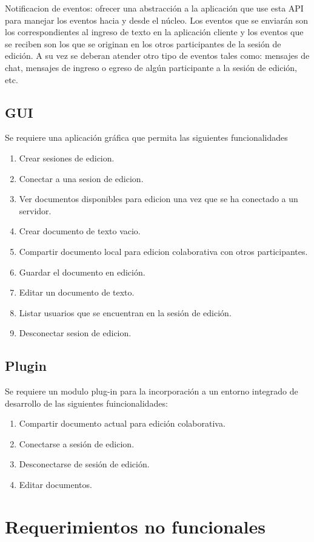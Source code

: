 \documentclass[12pt,a4paper]{article}
\begin{document}
Notificacion de eventos: ofrecer una abstracción a la aplicación que use esta API para manejar los eventos hacia y desde el núcleo. Los eventos que se enviarán son los correspondientes al ingreso de texto en la aplicación cliente y los eventos que se reciben son los que se originan en los otros participantes de la sesión de edición.
A su vez se deberan atender otro tipo de eventos tales como: mensajes de chat, mensajes de ingreso o egreso de algún participante a la sesión de edición, etc.

	\subsection{GUI} 
	Se requiere una aplicación gráfica que permita las siguientes funcionalidades
	\begin{enumerate}
	\item Crear sesiones de edicion.
	\item Conectar a una sesion de edicion.
	\item Ver documentos disponibles para edicion una vez que se ha conectado a un servidor.
	\item Crear documento de texto vacio.
	\item Compartir documento local para edicion colaborativa con otros participantes.
	\item Guardar el documento en edición.
	\item Editar un documento de texto.
	\item Listar usuarios que se encuentran en la sesión de edición.
	\item Desconectar sesion de edicion.
	\end{enumerate}


\subsection{Plugin}
Se requiere un modulo plug-in para la incorporación a un entorno integrado de desarrollo de las siguientes fuincionalidades:
	\begin{enumerate}
	\item Compartir documento actual para edición colaborativa.
	\item Conectarse a sesión de edicion.
	\item Desconectarse de sesión de edición.
	\item Editar documentos.
	\end{enumerate}
	\section{Requerimientos no funcionales}
\end{document}
